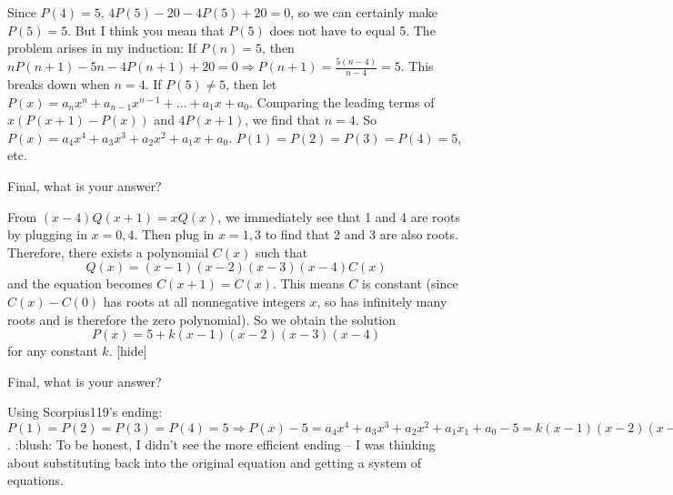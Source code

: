 \begin{solution}
	Since $P(4) = 5$, $4P(5)-20-4P(5)+20=0$, so we can certainly make $P(5)=5$. But I think you mean that $P(5)$ does not have to equal 5. The problem arises in my induction: If $P(n) = 5$, then $nP(n+1)-5n-4P(n+1)+20 = 0 \Rightarrow P(n+1) = \frac{5(n-4)}{n-4}= 5$. This breaks down when $n=4$. If $P(5) \ne 5$, then let $P(x) = a_{n}x^{n}+a_{n-1}x^{n-1}+...+a_{1}x+a_{0}$. Comparing the leading terms of $x(P(x+1)-P(x))$ and $4P(x+1)$, we find that $n=4$. So $P(x) = a_{4}x^{4}+a_{3}x^{3}+a_{2}x^{2}+a_{1}x+a_{0}$. $P(1)=P(2)=P(3)=P(4)=5$, etc.
\end{solution}



\begin{solution}
	Final, what is your answer?
\end{solution}



\begin{solution}
From $(x-4)Q(x+1)=xQ(x)$, we immediately see that 1 and 4 are roots by plugging in $x=0,4$. Then plug in $x=1,3$ to find that 2 and 3 are also roots. Therefore, there exists a polynomial $C(x)$ such that
\[Q(x)=(x-1)(x-2)(x-3)(x-4)C(x)\]
and the equation becomes $C(x+1)=C(x)$. This means $C$ is constant (since $C(x)-C(0)$ has roots at all nonnegative integers $x$, so has infinitely many roots and is therefore the zero polynomial). So we obtain the solution
\[P(x)=5+k(x-1)(x-2)(x-3)(x-4)\]
for any constant $k$.
[\/hide]
\end{solution}



\begin{solution}
	\begin{tcolorbox}Final, what is your answer?\end{tcolorbox}
Using Scorpius119's ending: $P(1) =P(2)=P(3)=P(4) = 5 \Rightarrow P(x)-5 = a_{4}x^{4}+a_{3}x^{3}+a_{2}x^{2}+a_{1}x_{1}+a_{0}-5 = k(x-1)(x-2)(x-3)(x-4)$.
 :blush: To be honest, I didn't see the more efficient ending -- I was thinking about substituting back into the original equation and getting a system of equations.
\end{solution}




